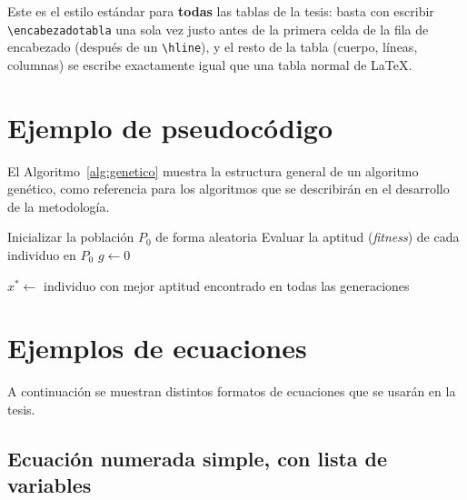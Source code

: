 Este es el estilo estándar para \textbf{todas} las tablas de la tesis: basta
con escribir \verb|\encabezadotabla| una sola vez justo antes de la primera
celda de la fila de encabezado (después de un \verb|\hline|), y el resto de
la tabla (cuerpo, líneas, columnas) se escribe exactamente igual que una
tabla normal de LaTeX.

\section{Ejemplo de pseudocódigo}
\label{sec:ejemplo-pseudocodigo}

El Algoritmo~\ref{alg:genetico} muestra la estructura general de un
algoritmo genético, como referencia para los algoritmos que se describirán
en el desarrollo de la metodología.

\begin{algorithm}[htbp]
    \caption{Estructura general de un algoritmo genético}
    \label{alg:genetico}

    Inicializar la población $P_0$ de forma aleatoria\;
    Evaluar la aptitud (\textit{fitness}) de cada individuo en $P_0$\;
    $g \leftarrow 0$\;


    $x^* \leftarrow$ individuo con mejor aptitud encontrado en todas las generaciones\;
\end{algorithm}

\section{Ejemplos de ecuaciones}
\label{sec:ejemplo-ecuaciones}

A continuación se muestran distintos formatos de ecuaciones que se usarán
en la tesis.

\subsection{Ecuación numerada simple, con lista de variables}


